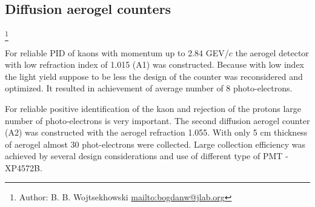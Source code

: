 \subsection [Diffusion aerogel counters] {Diffusion aerogel counters}

\footnote{Author: B. B. Wojtsekhowski \url{mailto:bogdanw@jlab.org}}

For reliable PID of kaons with momentum up to 2.84 GEV/$c$ 
the aerogel detector with low refraction index of 1.015 (A1) was constructed.
Because with low index the light yield suppose to be less the design
of the counter was reconsidered and optimized. It resulted in
achievement of average number of 8 photo-electrons.

For reliable positive identification of the kaon and rejection of the protons 
large number of photo-electrons is very important. The second  diffusion
aerogel counter (A2) was constructed with the aerogel refraction 1.055. 
With only 5 cm thickness of aerogel almost 30 phot-electrons were collected. 
Large collection efficiency was achieved by several design considerations and
use of different type of PMT - XP4572B.



